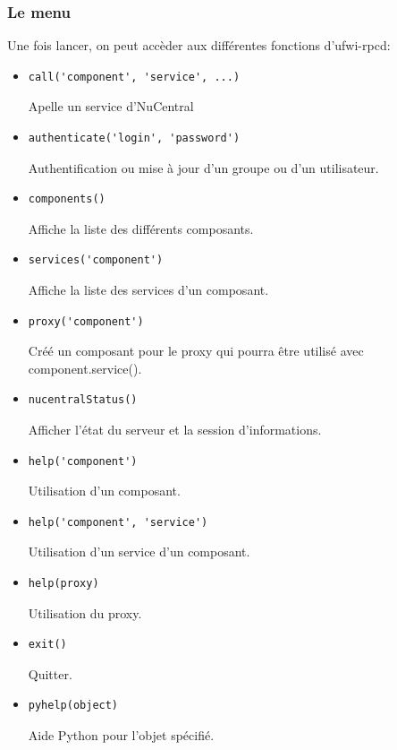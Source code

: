 \documentclass[12pt]{report}
\begin{document}
\begin{itemize}
\subsubsection{Le menu}
Une fois lancer, on peut accèder aux différentes fonctions d'ufwi-rpcd:
\begin{itemize}
  \item \begin{verbatim}call('component', 'service', ...)\end{verbatim}
  Apelle un service d'NuCentral
  \item \begin{verbatim}authenticate('login', 'password')\end{verbatim}
  Authentification ou mise à jour d'un groupe ou d'un utilisateur.
  \item \begin{verbatim}components()\end{verbatim}
  Affiche la liste des différents composants.
  \item \begin{verbatim}services('component')\end{verbatim}
  Affiche la liste des services d'un composant.
  \item \begin{verbatim}proxy('component')\end{verbatim}
  Créé un composant pour le proxy qui pourra être utilisé avec component.service().
  \item \begin{verbatim}nucentralStatus()\end{verbatim}
  Afficher l'état du serveur et la session d'informations.
  \item \begin{verbatim}help('component')\end{verbatim}
  Utilisation d'un composant.
  \item \begin{verbatim}help('component', 'service')\end{verbatim}
  Utilisation d'un service d'un composant.
  \item \begin{verbatim}help(proxy)\end{verbatim}
  Utilisation du proxy.
  \item \begin{verbatim}exit()\end{verbatim}
  Quitter.
  \item \begin{verbatim}pyhelp(object)\end{verbatim}
  Aide Python pour l'objet spécifié.
  

\end{itemize}
\end{itemize}
\end{document}
